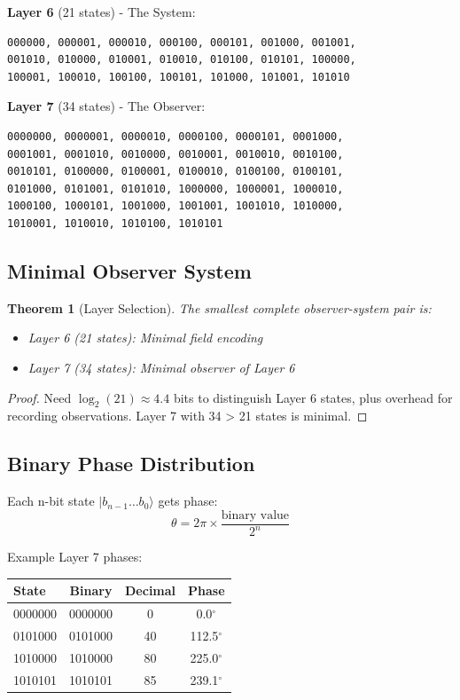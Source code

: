 \documentclass[%
 reprint,
 amsmath,amssymb,
 aps,
 prd,
 10pt,
 nofootinbib,      %
 longbibliography  %
]{revtex4-2}
\newtheorem{theorem}{Theorem}[section]
\theoremstyle{definition}
\theoremstyle{remark}
\begin{document}
\textbf{Layer 6} (21 states) - The System:
{\footnotesize
\begin{verbatim}
000000, 000001, 000010, 000100, 000101, 001000, 001001,
001010, 010000, 010001, 010010, 010100, 010101, 100000,
100001, 100010, 100100, 100101, 101000, 101001, 101010
\end{verbatim}
}

\textbf{Layer 7} (34 states) - The Observer:
{\footnotesize
\begin{verbatim}
0000000, 0000001, 0000010, 0000100, 0000101, 0001000,
0001001, 0001010, 0010000, 0010001, 0010010, 0010100,
0010101, 0100000, 0100001, 0100010, 0100100, 0100101,
0101000, 0101001, 0101010, 1000000, 1000001, 1000010,
1000100, 1000101, 1001000, 1001001, 1001010, 1010000,
1010001, 1010010, 1010100, 1010101
\end{verbatim}
}

\subsection{Minimal Observer System}

\begin{theorem}[Layer Selection]
The smallest complete observer-system pair is:
\begin{itemize}
\item Layer 6 (21 states): Minimal field encoding
\item Layer 7 (34 states): Minimal observer of Layer 6
\end{itemize}
\end{theorem}

\begin{proof}
Need $\log_2(21) \approx 4.4$ bits to distinguish Layer 6 states, plus overhead for recording observations. Layer 7 with 34 > 21 states is minimal.
\end{proof}

\subsection{Binary Phase Distribution}

Each n-bit state $|b_{n-1}\ldots b_0\rangle$ gets phase:
\begin{equation}
\theta = 2\pi \times \frac{\text{binary value}}{2^n}
\end{equation}

Example Layer 7 phases:
\begin{center}
\begin{tabular}{lccc}
\toprule
State & Binary & Decimal & Phase \\
\midrule
0000000 & 0000000 & 0 & 0.0$^\circ$ \\
0101000 & 0101000 & 40 & 112.5$^\circ$ \\
1010000 & 1010000 & 80 & 225.0$^\circ$ \\
1010101 & 1010101 & 85 & 239.1$^\circ$ \\
\bottomrule
\end{tabular}
\end{center}
\end{document}
